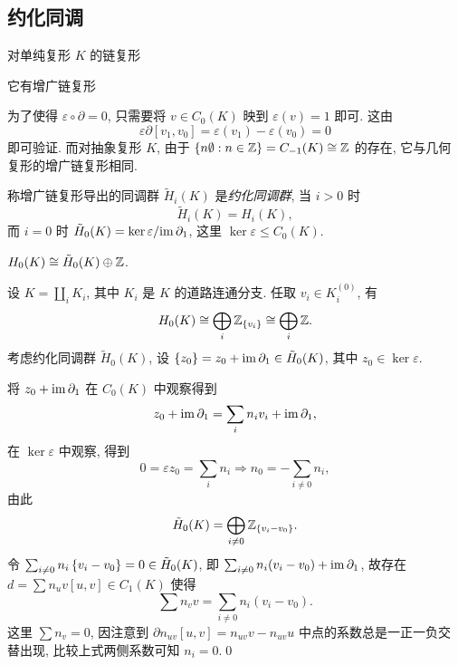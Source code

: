 	\subsection{约化同调}

	对单纯复形 $ K $ 的链复形
	\begin{center}
	\end{center}
	它有增广链复形
	\begin{center}
	\end{center}
	为了使得 $ \varepsilon\circ\partial=0 $, 只需要将 $ v\in C_0(K) $ 映到 $ \varepsilon(v)=1 $ 即可. 这由
	\[
		\varepsilon\partial[v_1,v_0]=\varepsilon(v_1)-\varepsilon(v_0)=0
	\]
	即可验证. 而对抽象复形 $ K $, 由于 $ \left\{ n\emptyset : n\in\mathbb{Z} \right\}=C_{-1}(K)\cong\mathbb{Z} $ 的存在, 它与几何复形的增广链复形相同.

	\begin{Definition}[约化同调]
		称增广链复形导出的同调群 $ \tilde{H}_i(K) $ 是\emph{约化同调群}, 当 $ i>0 $ 时
		\[
			\tilde{H}_i(K)=H_i(K),
		\]
		而 $ i=0 $ 时 $ \tilde{H}_0(K)=\ker\varepsilon/\mathrm{im}\,\partial_1 $, 这里 $ \ker\varepsilon\leqslant C_0(K) $.
	\end{Definition}

	\begin{Proposition}
		$ H_0(K)\cong\tilde{H}_0(K)\oplus\mathbb{Z} $.
	\end{Proposition}
	\begin{Proof}
		设 $ K=\coprod_{i}K_i $, 其中 $ K_i $ 是 $ K $ 的道路连通分支. 任取 $ v_i\in K_i^{(0)} $, 有
		\[
			H_0(K)\cong\bigoplus_{i}\mathbb{Z}_{\left\{ v_i \right\}}\cong\bigoplus_{i}\mathbb{Z}.
		\]
		考虑约化同调群 $ \tilde{H}_0(K) $, 设 $ \left\{ z_0 \right\}=z_0+\mathrm{im}\,\partial_1\in\tilde{H}_0(K) $, 其中 $ z_0\in\ker\varepsilon $.

		将 $ z_0+\mathrm{im}\,\partial_1 $ 在 $ C_0(K) $ 中观察得到
		\[
			z_0+\mathrm{im}\,\partial_1=\sum_{i}n_iv_i+\mathrm{im}\,\partial_1,
		\]
		在 $ \ker\varepsilon $ 中观察, 得到
		\[
			0=\varepsilon z_0=\sum_{i}n_i\Longrightarrow n_0=-\sum_{i\ne 0}n_i,
		\]
		由此
		\[
			\tilde{H}_0(K)=\bigoplus_{i\ne 0}\mathbb{Z}_{\left\{ v_i-v_0 \right\}}.
		\]
		令 $ \sum_{i\ne 0}n_i\left\{ v_i-v_0 \right\}=0\in\tilde{H}_0(K) $, 即 $ \sum_{i\ne 0}n_i(v_i-v_0)+\mathrm{im}\,\partial_1 $, 故存在 $ d=\sum n_uv[u,v]\in C_1(K) $ 使得
		\[
			\sum n_vv=\sum_{i\ne 0}n_i(v_i-v_0).
		\]
		这里 $ \sum n_v=0 $, 因注意到 $ \partial n_{uv}[u,v]=n_{uv}v-n_{uv}u $ 中点的系数总是一正一负交替出现, 比较上式两侧系数可知 $ n_i=0 $.\qed
	\end{Proof}

